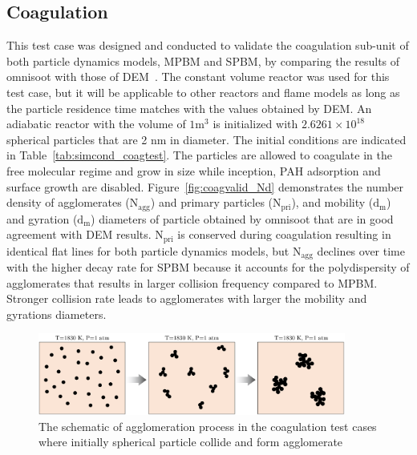 \subsection{Coagulation}
This test case was designed and conducted to validate the coagulation sub-unit of both particle dynamics models, MPBM and SPBM, by comparing the results of omnisoot with those of DEM~\citep{kholghy2021surface}. The constant volume reactor was used for this test case, but it will be applicable to other reactors and flame models as long as the particle residence time matches with the values obtained by DEM. An adiabatic reactor with the volume of $1 \mathrm{m^3}$ is initialized with $2.6261\times10^{18}$ spherical particles that are 2 nm in diameter. The initial conditions are indicated in Table~\ref{tab:simcond_coagtest}. The particles are allowed to coagulate in the free molecular regime and grow in size while inception, PAH adsorption and surface growth are disabled. Figure~\ref{fig:coagvalid_Nd} demonstrates the number density of agglomerates ($\mathrm{N_{agg}}$) and primary particles ($\mathrm{N_{pri}}$), and mobility ($\mathrm{d_m}$) and gyration ($\mathrm{d_m}$) diameters of particle obtained by omnisoot that are in good agreement with DEM results. $\mathrm{N_{pri}}$ is conserved during coagulation resulting in identical flat lines for both particle dynamics models, but $\mathrm{N_{agg}}$ declines over time with the higher decay rate for SPBM because it accounts for the polydispersity of agglomerates that results in larger collision frequency compared to MPBM. Stronger collision rate leads to agglomerates with larger the mobility and gyrations diameters.

\begin{figure}[!htbp]
	\centering
	\includegraphics[width=0.9\textwidth]{Figures/Results/Validation/Coagulation/coagulation_scheme.pdf}
	\caption{The schematic of agglomeration process in the coagulation test cases where initially spherical particle collide and form agglomerate}
	\label{fig:coagscheme}
\end{figure}

